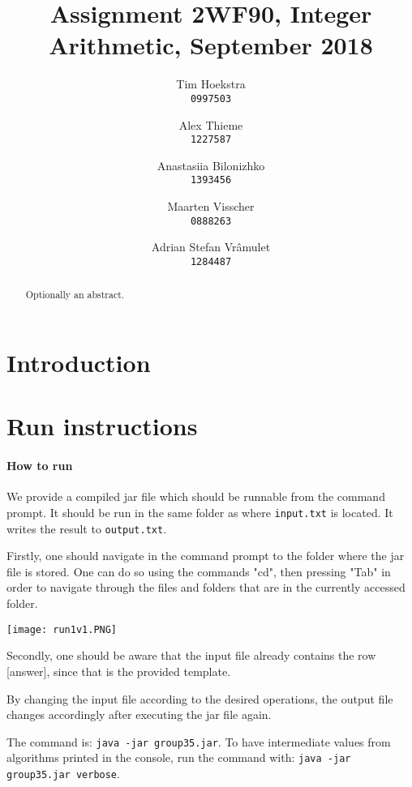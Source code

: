 \documentclass[a4paper]{article}
\title{Assignment 2WF90, Integer Arithmetic, September 2018}
\author{
    Tim Hoekstra\\
    \texttt{0997503}
    \and
    Alex Thieme\\
    \texttt{1227587}
    \and
    Anastasiia Bilonizhko\\
    \texttt{1393456}
    \and
    Maarten Visscher\\
    \texttt{0888263}
    \and
    Adrian Stefan Vr\^amulet\\
    \texttt{1284487}
}
\begin{document}
\maketitle



\begin{abstract}
Optionally an abstract.
\end{abstract}

\section*{Introduction}

\tableofcontents




\section{Run instructions}



\paragraph{How to run}

We provide a compiled jar file which should be runnable from the command prompt.
It should be run in the same folder as where \texttt{input.txt} is located.
It writes the result to \texttt{output.txt}.

Firstly, one should navigate in the command prompt to the folder where the jar file is stored. One can do so using the commands "cd", then pressing "Tab" in order to navigate through the files and folders that are in the currently accessed folder. 

\texttt{[image: run1v1.PNG]}

Secondly, one should be aware that the input file already contains the row [answer], since that is the provided template. 

By changing the input file according to the desired operations, the output file changes accordingly after executing the jar file again. 

The command is: \texttt{java -jar group35.jar}.
To have intermediate values from algorithms printed in the console, run the command with:
\texttt{java -jar group35.jar verbose}.
\end{document}
